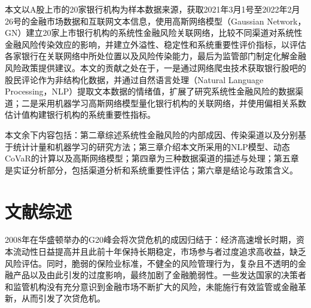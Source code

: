 \documentclass[lang=cn]{elegantpaper}
\begin{document}

本文以A股上市的20家银行机构为样本数据来源，获取2021年3月1号至2022年2月26号的金融市场数据和互联网文本信息，使用高斯网络模型（Gaussian Network，GN）建立20家上市银行机构的系统性金融风险关联网络，比较不同渠道对系统性金融风险传染效应的影响，并建立外溢性、稳定性和系统重要性评价指标，以评估各家银行在关联网络中所处位置以及风险传染能力，最后为监管部门制定化解金融风险政策提供建议。本文的贡献之处在于，一是通过网络爬虫技术获取银行股吧的股民评论作为非结构化数据，并通过自然语言处理（Natural Language Processing，NLP）提取文本数据的情绪值，扩展了研究系统性金融风险的数据渠道；二是采用机器学习高斯网络模型量化银行机构的关联网络，并使用偏相关系数估计值构建银行机构的系统重要性指标。

本文余下内容包括：第二章综述系统性金融风险的内部成因、传染渠道以及分别基于统计计量和机器学习的研究方法；第三章介绍本文所采用的NLP模型、动态CoVaR的计算以及高斯网络模型；第四章为三种数据渠道的描述与处理；第五章是实证分析部分，包括渠道分析和系统重要性评估；第六章是结论与政策含义。

\section{文献综述}

2008年在华盛顿举办的G20峰会将次贷危机的成因归结于：经济高速增长时期，资本流动性日益提高并且此前十年保持长期稳定，市场参与者过度追求高收益，缺乏风险评估。同时，脆弱的保险业标准，不健全的风险管理行为，复杂且不透明的金融产品以及由此引发的过度影响，最终加剧了金融脆弱性。一些发达国家的决策者和监管机构没有充分意识到金融市场不断扩大的风险，未能施行有效监管或金融革新，从而引发了次贷危机。
\end{document}
